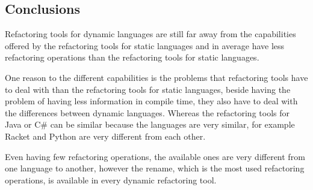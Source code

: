

\subsection{Conclusions}

Refactoring tools for dynamic languages are still far away from the capabilities offered by the refactoring tools for static languages and in average have less refactoring operations than the refactoring tools for static languages.

One reason to the different capabilities is the problems that refactoring tools have to deal with than the refactoring tools for static languages, beside having the problem of having less information in compile time, they also have to deal with the differences between dynamic languages. Whereas the refactoring tools for Java or C\# can be similar because the languages are very similar, for example Racket and Python are very different from each other.

Even having few refactoring operations, the available ones are very different from one language to another, however the rename, which is the most used refactoring operations, is available in every dynamic refactoring tool.

